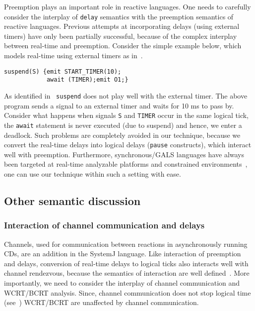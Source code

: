 Preemption plays an important role in reactive languages. One needs to
carefully consider the interplay of \texttt{delay} semantics with the
preemption semantics of reactive languages. Previous attempts at
incorporating delays (using external timers) have only been partially
successful, because of the complex interplay between real-time and
preemption. Consider the simple example below, which models real-time
using external timers as in~\cite{rsh94}. 

{\small
\begin{verbatim}
suspend(S) {emit START_TIMER(10); 
            await (TIMER);emit O1;}
\end{verbatim}
}

As identified in~\cite{Bourke2009a} \texttt{suspend} does not play well
with the external timer. The above program sends a signal to an external
timer and waits for 10 ms to pass by. Consider what happens when signals
\texttt{S} and \texttt{TIMER} occur in the same logical tick, the
\texttt{await} statement is never executed (due to suspend) and hence,
we enter a deadlock. Such problems are completely avoided in our
technique, because we convert the real-time delays into logical delays
(\texttt{pause} constructs), which interact well with preemption.
Furthermore, synchronous/GALS languages have always been targeted at
real-time analyzable platforms and constrained
environments~\cite{DBLP:journals/pieee/SifakisTY03,boldt07}, one can use
our technique within such a setting with ease.

\subsection{Other semantic discussion}
\label{sec:other-semant-dissc}

\subsubsection{Interaction of channel communication and delays}
\label{sec:inter-chann-comm}

Channels, used for communication between reactions in asynchronously
running CDs, are an addition in the SystemJ language. Like interaction
of preemption and delays, conversion of real-time delays to logical
ticks also interacts well with channel rendezvous, because the semantics
of interaction are well defined~\cite{amal10}. More importantly, we need
to consider the interplay of channel communication and WCRT/BCRT
analysis. Since, channel communication does not stop logical time
(see~\cite{amal10}) WCRT/BCRT are unaffected by channel
communication. %

